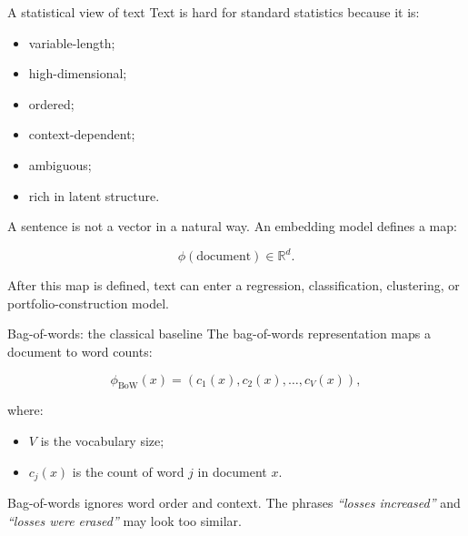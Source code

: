 \documentclass[aspectratio=169]{beamer}
\newcommand{\R}{\mathbb{R}}
\begin{document}
\begin{frame}{A statistical view of text}
\large
Text is hard for standard statistics because it is:

\vspace{0.15cm}

\begin{itemize}
  \item variable-length;
  \item high-dimensional;
  \item ordered;
  \item context-dependent;
  \item ambiguous;
  \item rich in latent structure.
\end{itemize}

\vspace{0.3cm}

A sentence is not a vector in a natural way. An embedding model defines a map:

\[
\phi(\text{document}) \in \R^d.
\]

\vspace{0.15cm}

After this map is defined, text can enter a regression, classification, clustering, or portfolio-construction model.
\end{frame}

\begin{frame}{Bag-of-words: the classical baseline}
\large
The bag-of-words representation maps a document to word counts:

\[
\phi_{\text{BoW}}(x) = (c_1(x),c_2(x),\ldots,c_V(x)),
\]

where:
\begin{itemize}
  \item \(V\) is the vocabulary size;
  \item \(c_j(x)\) is the count of word \(j\) in document \(x\).
\end{itemize}

\vspace{0.3cm}

\begin{redbox}
Bag-of-words ignores word order and context. The phrases \textit{``losses increased''} and \textit{``losses were erased''} may look too similar.
\end{redbox}
\end{frame}
\end{document}
